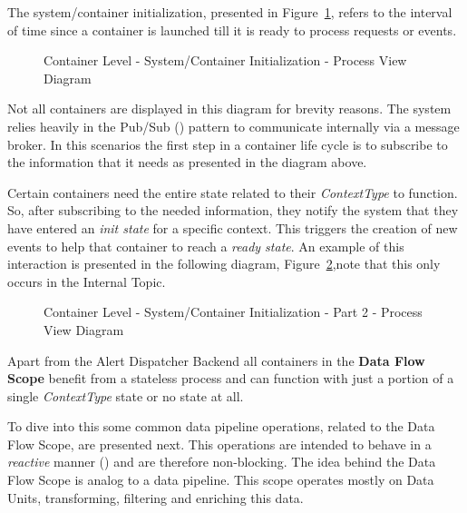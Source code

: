 The system/container initialization, presented in Figure~\ref{fig:design:architecture:container:process:diagram:init}, refers to the interval of time since a container is launched till it is ready to process requests or events.

\begin{figure}[H]
   \centering
   \resizebox{\columnwidth}{!}
   {      
      
   }
   \caption[Container Level - System/Container Initialization - Process View Diagram]{Container Level - System/Container Initialization - Process View Diagram}
   \label{fig:design:architecture:container:process:diagram:init}
\end{figure}

Not all containers are displayed in this diagram for brevity reasons.
The system relies heavily in the Pub/Sub (\cite{pubsub}) pattern to communicate internally via a message broker. In this scenarios the first step in a container life cycle is to subscribe to the information that it needs as presented in the diagram above.

Certain containers need the entire state related to their \textit{ContextType} to function. So, after subscribing to the needed information, they notify the system that they have entered an \textit{init state} for a specific context. This triggers the creation of new events to help that container to reach a \textit{ready state}. An example of this interaction is presented in the following diagram, Figure~\ref{fig:design:architecture:container:process:diagram:ready},note that this only occurs in the Internal Topic.

\begin{figure}[H]
   \centering
   \resizebox{\columnwidth}{!}
   {      
      
   }
   \caption[Container Level - System/Container Initialization - Part 2 - Process View Diagram]{Container Level - System/Container Initialization - Part 2 - Process View Diagram}
   \label{fig:design:architecture:container:process:diagram:ready}
\end{figure}

Apart from the Alert Dispatcher Backend all containers in the \textbf{Data Flow Scope} benefit from a stateless process and can function with just a portion of a single \textit{ContextType} state or no state at all.

To dive into this some common data pipeline operations, related to the Data Flow Scope, are presented next. This operations are intended to behave in a \textit{reactive} manner (\cite{reactivemanifesto}) and are therefore non-blocking. The idea behind the Data Flow Scope is analog to a data pipeline. This scope operates mostly on Data Units, transforming, filtering and enriching this data.

